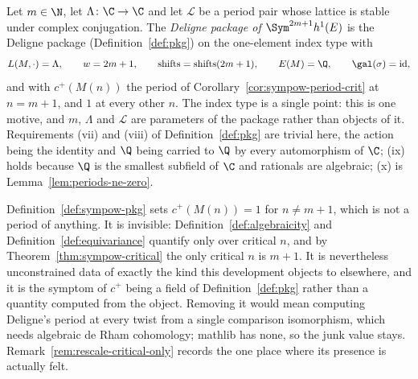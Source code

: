 \begin{definition}
  \label{def:sympow-pkg}
  Let $m \in \N$, let $\Lambda \colon \C \to \C$ and let $\mathcal{L}$ be a period pair
  whose lattice is stable under complex conjugation. The \emph{Deligne package of
  $\Sym^{2m+1}h^{1}(E)$} is the Deligne package (Definition~\ref{def:pkg}) on the one-element
  index type with
  \[
    L(M,\cdot) = \Lambda, \qquad w = 2m+1, \qquad \mathrm{shifts} = \mathrm{shifts}(2m+1),
    \qquad E(M) = \Q, \qquad \gal(\sigma) = \mathrm{id},
  \]
  and with $c^{+}(M(n))$ the period of Corollary~\ref{cor:sympow-period-crit} at $n=m+1$, and
  $1$ at every other $n$. The index type is a single point: this is one motive, and $m$,
  $\Lambda$ and $\mathcal{L}$ are parameters of the package rather than objects of it.
  Requirements (vii) and (viii) of Definition~\ref{def:pkg} are trivial here, the action being
  the identity and $\Q$ being carried to $\Q$ by every automorphism of $\C$; (ix) holds
  because $\Q$ is the smallest subfield of $\C$ and rationals are algebraic; (x) is
  Lemma~\ref{lem:periods-ne-zero}.
\end{definition}

\begin{remark}
  \label{rem:sympow-pkg-junk}
  Definition~\ref{def:sympow-pkg} sets $c^{+}(M(n)) = 1$ for $n \neq m+1$, which is not a
  period of anything. It is invisible: Definition~\ref{def:algebraicity} and
  Definition~\ref{def:equivariance} quantify only over critical $n$, and by
  Theorem~\ref{thm:sympow-critical} the only critical $n$ is $m+1$. It is nevertheless
  unconstrained data of exactly the kind this development objects to elsewhere, and it is the
  symptom of $c^{+}$ being a field of Definition~\ref{def:pkg} rather than a quantity
  computed from the object. Removing it would mean computing Deligne's period at every twist
  from a single comparison isomorphism, which needs algebraic de Rham cohomology; mathlib has
  none, so the junk value stays. Remark~\ref{rem:rescale-critical-only} records the one place
  where its presence is actually felt.
\end{remark}

